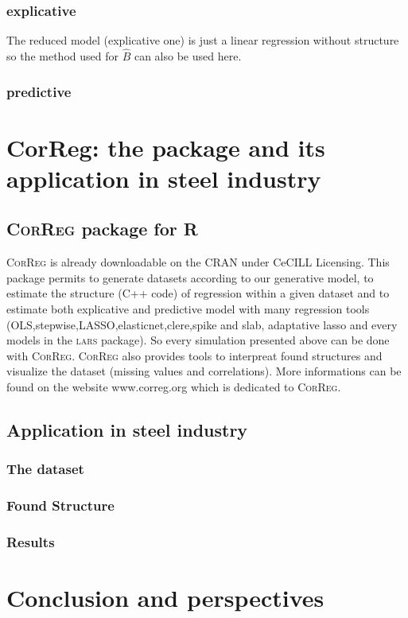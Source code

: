 \documentclass[11pt,a4paper]{report}
\begin{document}
		\subsection{explicative}
			The reduced model (explicative one) is just a linear regression without structure so the method used for $\hat{B}$ can also be used here. 
		\subsection{predictive}
			
\chapter{CorReg: the package and its application in steel industry}	
	\section{\textsc{CorReg} package for R}
	\textsc{CorReg} is already downloadable on the CRAN under CeCILL Licensing. This package permits to generate datasets according to our generative model, to estimate the structure (C++ code) of regression within a given dataset and to estimate both explicative and predictive model with many regression tools (OLS,stepwise,LASSO,elasticnet,clere,spike and slab, adaptative lasso and every models in the \textsc{lars} package). So every simulation presented above can be done with \textsc{CorReg}.
	\textsc{CorReg} also provides tools to interpreat found structures and visualize the dataset (missing values and correlations). More informations can be found on the website www.correg.org which is dedicated to \textsc{CorReg}.
	\section{Application in steel industry}
		\subsection{The dataset}
		\subsection{Found Structure}
		\subsection{Results}
\chapter{Conclusion and perspectives}
\end{document}
